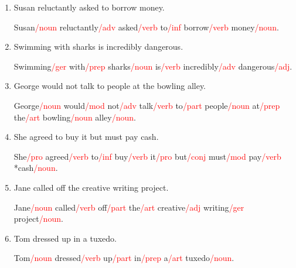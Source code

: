 \documentclass[11pt]{article}
\begin{document}
\begin{enumerate}
\begin{enumerate}
\item Susan reluctantly asked to borrow money. 
\par Susan\textcolor{red}{{/\sc noun}} reluctantly\textcolor{red}{{/\sc adv}} asked\textcolor{red}{{/\sc verb}} to\textcolor{red}{{/\sc inf}} borrow\textcolor{red}{{/\sc verb}} money\textcolor{red}{{/\sc noun}}. 

\item Swimming with sharks is incredibly dangerous.
\par Swimming\textcolor{red}{{/\sc ger}} with\textcolor{red}{{/\sc prep}} sharks\textcolor{red}{{/\sc noun}} is\textcolor{red}{{/\sc verb}} incredibly\textcolor{red}{{/\sc adv}} dangerous\textcolor{red}{{/\sc adj}}.

\item George would not talk to people at the bowling alley. 
\par George\textcolor{red}{{/\sc noun}} would\textcolor{red}{{/\sc mod}} not\textcolor{red}{{/\sc adv}} talk\textcolor{red}{{/\sc verb}} to\textcolor{red}{{/\sc part}} people\textcolor{red}{{/\sc noun}} at\textcolor{red}{{/\sc prep}} the\textcolor{red}{{/\sc art}} bowling\textcolor{red}{{/\sc noun}} alley\textcolor{red}{{/\sc noun}}. 

\item She agreed to buy it but must pay cash. 
\par She\textcolor{red}{{/\sc pro}} agreed\textcolor{red}{{/\sc verb}} to\textcolor{red}{{/\sc inf}} buy\textcolor{red}{{/\sc verb}} it\textcolor{red}{{/\sc pro}} but\textcolor{red}{{/\sc conj}} must\textcolor{red}{{/\sc mod}} pay\textcolor{red}{{/\sc verb}} \\*cash\textcolor{red}{{/\sc noun}}. 

\item Jane called off the creative writing project. 
\par Jane\textcolor{red}{{/\sc noun}} called\textcolor{red}{{/\sc verb}} off\textcolor{red}{{/\sc part}} the\textcolor{red}{{/\sc art}} creative\textcolor{red}{{/\sc adj}} writing\textcolor{red}{{/\sc ger}} project\textcolor{red}{{/\sc noun}}. 

\item Tom dressed up in a tuxedo. 
\par Tom\textcolor{red}{{/\sc noun}} dressed\textcolor{red}{{/\sc verb}} up\textcolor{red}{{/\sc part}} in\textcolor{red}{{/\sc prep}} a\textcolor{red}{{/\sc art}} tuxedo\textcolor{red}{{/\sc noun}}. 

\end{enumerate}



\end{enumerate}
\end{document}
